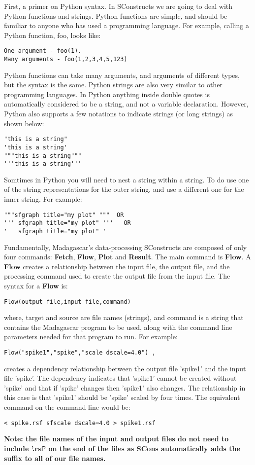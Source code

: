 First, a primer on Python syntax.  In SConstructs we are going to deal with Python functions and strings.  Python functions are simple, and should be familiar to anyone who has used a programming language.  For example, calling a Python function, foo, looks like:
\begin{verbatim}
One argument - foo(1).
Many arguments - foo(1,2,3,4,5,123)
\end{verbatim}
Python functions can take many arguments, and arguments of different types, but the syntax is the same.  Python strings are also very similar to other programming languages.  In Python anything inside double quotes is automatically considered to be a string, and not a variable declaration.  However, Python also supports a few  notations to indicate strings (or long strings) as shown below:
\begin{verbatim}
"this is a string"
'this is a string'
"""this is a string"""
'''this is a string'''
\end{verbatim}
Somtimes in Python you will need to nest a string within a string.  To do use one of the string representations for the outer string, and use a different one for the inner string.  For example:
\begin{verbatim}
"""sfgraph title="my plot" """  OR
''' sfgraph title="my plot" '''   OR
'   sfgraph title="my plot" ' 
\end{verbatim}

Fundamentally, Madagascar's data-processing SConstructs are composed of only four commands: \textbf{Fetch}, \textbf{Flow}, \textbf{Plot} and \textbf{Result}.  The main command is \textbf{Flow}.  A \textbf{Flow} creates a relationship between the input file, the output file, and the processing command used to create the output file from the input file.  The syntax for a \textbf{Flow} is:

\begin{verbatim}
Flow(output file,input file,command)
\end{verbatim}
where, target and source are file names (strings), and command is a string that contains the Madagascar program to be used, along with the command line parameters needed for that program to run.  For example:
\begin{verbatim}
Flow("spike1","spike","scale dscale=4.0") ,
\end{verbatim}
creates a dependency relationship between the output file 'spike1' and the input file 'spike'.  The dependency indicates that 'spike1' cannot be created without 'spike' and that if 'spike' changes then 'spike1' also changes.  The relationship in this case is that 'spike1' should be 'spike' scaled by four times.  The equivalent command on the command line would be: 
\begin{verbatim}
< spike.rsf sfscale dscale=4.0 > spike1.rsf
\end{verbatim}
\textbf{Note: the file names of the input and output files do not need to include '.rsf' on the end of the files as SCons automatically adds the suffix to all of our file names.}

